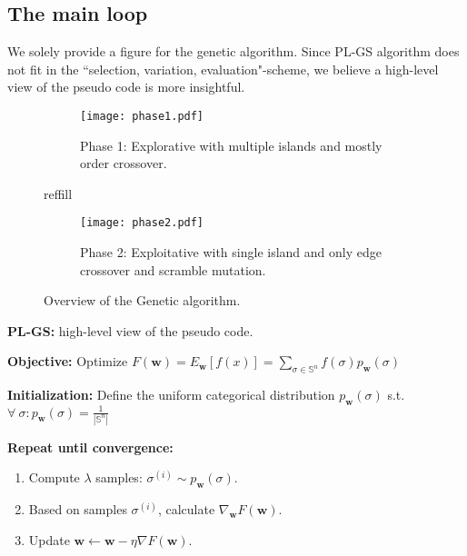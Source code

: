 \documentclass[a4paper,10pt]{article}
\newcommand{\ReplaceMe}[1]{{\color{blue}#1}}
\begin{document}
\subsection{The main loop}
	We solely provide a figure for the genetic algorithm. Since  PL-GS algorithm does not fit in the ``selection, variation, evaluation"-scheme, we believe a high-level view of the pseudo code is more insightful.
	
	\begin{figure}[h]
		\centering
		\begin{subfigure}{0.45\textwidth}
			\texttt{[image: phase1.pdf]}
			\caption{Phase 1: Explorative with multiple islands and mostly order crossover.}
			\label{fig:croppedfile1}
		\end{subfigure}
		reffill
		\begin{subfigure}{0.45\textwidth}
			\texttt{[image: phase2.pdf]}
			\caption{Phase 2: Exploitative with single island and only edge crossover and scramble mutation.}
			\label{fig:croppedfile2}
		\end{subfigure}
		\caption{Overview of the Genetic algorithm.}
		\label{fig:comparison}
	\end{figure}
	
	
	\textbf{PL-GS:} high-level view of the pseudo code.
		
	\textbf{Objective:} Optimize $F(\mathbf{w}) = E_\mathbf{w}[f(x)] = \sum_{\sigma \in \mathbb{S}^n} f(\sigma) p_\mathbf{w}(\sigma)$
	
	\textbf{Initialization:} Define the uniform categorical distribution $p_\mathbf{w}(\sigma)$ s.t. $\forall~\sigma: p_\mathbf{w}(\sigma)=\frac{1}{|\mathbb{S}^n|}$
	
	\textbf{Repeat until convergence:}
	\begin{enumerate}
		\item Compute $\lambda$ samples: $\sigma^{(i)} \sim p_\mathbf{w}(\sigma)$.
		\item Based on samples $\sigma^{(i)}$, calculate $\nabla_{\mathbf{w}} F\left(\mathbf{w}\right)$.
		\item Update $\mathbf{w} \leftarrow \mathbf{w} - \eta \nabla F\left(\mathbf{w}\right)$.
	\end{enumerate}
\end{document}

